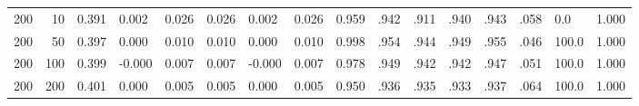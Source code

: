 \begin{table}[ht]
\begin{tabular}{rrllllllllllllll}
  200 & 10 & 0.391 & 0.002 & 0.026 & 0.026 & 0.002 & 0.026 & 0.959 & .942 & .911 & .940 & .943 & .058 & 0.0 & 1.000 \\ 
  200 & 50 & 0.397 & 0.000 & 0.010 & 0.010 & 0.000 & 0.010 & 0.998 & .954 & .944 & .949 & .955 & .046 & 100.0 & 1.000 \\ 
  200 & 100 & 0.399 & -0.000 & 0.007 & 0.007 & -0.000 & 0.007 & 0.978 & .949 & .942 & .942 & .947 & .051 & 100.0 & 1.000 \\ 
  200 & 200 & 0.401 & 0.000 & 0.005 & 0.005 & 0.000 & 0.005 & 0.950 & .936 & .935 & .933 & .937 & .064 & 100.0 & 1.000 \\ 
   \hline
\end{tabular}
\end{table}

